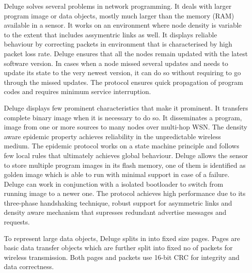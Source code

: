 \documentclass[conference,final]{IEEEtran}
\begin{document}
Deluge solves several problems in network programming. 
It deals with larger program image or data objects, mostly much larger than the memory (RAM) available in a sensor.
It works on an environment where node density is variable to the extent that includes assymentric links as well.
It displays reliable behaviour by correcting packets in environment that is characterised by high packet loss rate.
Deluge ensures that all the nodes remain updated with the latest software version.
In cases when a node missed several updates and needs to update its state to the very newest version, it can do so without requiring to go through the missed updates.
The protocol ensures quick propagation of program codes and requires minimum service interruption. 

Deluge displays few prominent characteristics that make it prominent.
It transfers complete binary image when it is necessary to do so. 
It disseminates a program, image from one or more sources to many nodes over multi-hop WSN.
The density aware epidemic property achieves reliability in the unpredictable wireless medium.
The epidemic protocol works on a state machine principle and follows few local rules that ultimately achieves global behaviour.
Deluge allows the sensor to store multiple program images in its flash memory, one of them is identified as golden image which is able to run with minimal support in case of a failure.
Deluge can work in conjunction with a isolated bootloader to switch from running image to a newer one.
The protocol achieves high performance due to its three-phase handshaking technique, robust support for asymmetric links and density aware mechanism that supresses redundant advertise messages and requests. 

To represent large data objects, Deluge splits in into fixed size pages.
Pages are basic data transfer objects which are further split into fixed no of packets for wireless transmission.
Both pages and packets use 16-bit CRC for integrity and data correctness.
\end{document}
